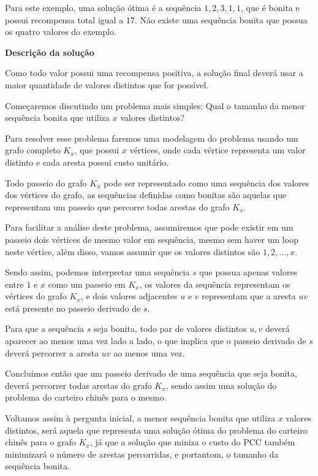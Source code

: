 \documentclass[12pt, a4paper]{article}
\begin{document}
        Para este exemplo, uma solução ótima é a sequência $1,2,3,1,1$, que é bonita e possui recompensa total igual a $17$. 
        Não existe uma sequência bonita que possua os quatro valores do exemplo.


        \textbf{Descrição da solução}

        Como todo valor possui uma recompensa positiva, a solução final deverá usar a maior quantidade de valores distintos que for possível.

        Começaremos discutindo um problema mais simples: Qual o tamanho da menor sequência bonita que utiliza $x$ valores distintos?

        Para resolver esse problema faremos uma modelagem do problema usando um grafo completo $K_x$, que possui $x$ vértices, onde cada vértice representa um valor distinto e cada aresta possui custo unitário.

        Todo passeio do grafo $K_x$ pode ser representado como uma sequência dos valores dos vértices do grafo, as sequências definidas como bonitas são aquelas que representam um passeio que percorre todas arestas do grafo $K_x$.

        Para facilitar a análise deste problema, assumiremos que pode existir em um passeio dois vértices de mesmo valor em sequência, mesmo sem haver um loop neste vértice, além disso, vamos assumir que os valores distintos são $1, 2, \dots, x$.

        Sendo assim, podemos interpretar uma sequência $s$ que possua apenas valores entre $1$ e $x$ como um passeio em $K_x$, os valores da sequência representam os vértices do grafo $K_x$, e dois valores adjacentes $u$ e $v$ representam que a aresta $uv$ está presente no passeio derivado de $s$. 
        
        Para que a sequência $s$ seja bonita, todo par de valores distintos $u, v$ deverá aparecer ao menos uma vez lado a lado, o que implica que o passeio derivado de $s$ deverá percorrer a aresta $uv$ ao menos uma vez.

        Concluimos então que um passeio derivado de uma sequência que seja bonita, deverá percorrer todas arestas do grafo $K_x$, sendo assim uma solução do problema do carteiro chinês para o mesmo.

        Voltamos assim à pergunta inicial, a menor sequência bonita que utiliza $x$ valores distintos, será aquela que representa uma solução ótima do problema do carteiro chinês para o grafo $K_x$, já que a solução que miniza o custo do PCC também minimizará o número de arestas percorridas, e portantom, o tamanho da sequência bonita.
 
\end{document}
